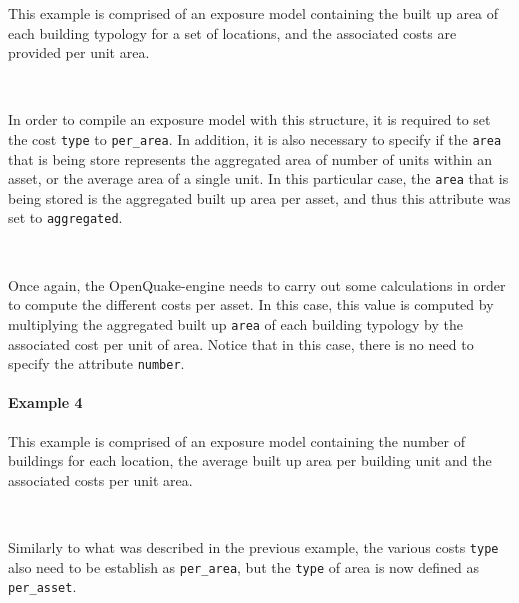 This example is comprised of an \gls{exposure model} containing the built up
area of each building typology for a set of locations, and the associated
costs are provided per unit area.

\inputminted[firstline=8,firstnumber=8,lastline=20,fontsize=\footnotesize,frame=single,linenos,bgcolor=lightgray]{xml}{oqum/risk/Verbatim/input_exposure_carea_aagg.xml}\\

In order to compile an \gls{exposure model} with this structure, it is
required to set the cost \Verb+type+ to \Verb+per_area+. In addition, it is
also necessary to specify if the \Verb+area+ that is being store represents
the aggregated area of number of units within an asset, or the average area of
a single unit. In this particular case, the \Verb+area+ that is being stored
is the aggregated built up area per asset, and thus this attribute was set to
\Verb+aggregated+.

\inputminted[firstline=21,firstnumber=21,lastline=31,fontsize=\footnotesize,frame=single,linenos,bgcolor=lightgray]{xml}{oqum/risk/Verbatim/input_exposure_carea_aagg.xml}\\

Once again, the OpenQuake-engine needs to carry out some calculations in order
to compute the different costs per asset. In this case, this value is computed
by multiplying the aggregated built up \Verb+area+ of each building typology
by the associated cost per unit of area. Notice that in this case, there is no
need to specify the attribute \Verb+number+.


\paragraph{Example 4}

This example is comprised of an \gls{exposure model} containing the number of
buildings for each location, the average built up area per building unit and
the associated costs per unit area.

\inputminted[firstline=8,firstnumber=8,lastline=20,fontsize=\footnotesize,frame=single,linenos,bgcolor=lightgray]{xml}{oqum/risk/Verbatim/input_exposure_carea_aunit.xml}\\

Similarly to what was described in the previous example, the various costs
\Verb+type+ also need to be establish as \Verb+per_area+, but the \Verb+type+
of area is now defined as \Verb+per_asset+.

\inputminted[firstline=21,firstnumber=21,lastline=31,fontsize=\footnotesize,frame=single,linenos,bgcolor=lightgray]{xml}{oqum/risk/Verbatim/input_exposure_carea_aunit.xml}\\

